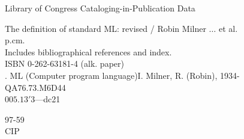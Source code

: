 \documentclass[12pt,twoside]{article}
\begin{document}
\noindent
Library of Congress Cataloging-in-Publication Data
\medskip
\begin{flushleft}
The definition of standard ML: revised / Robin Milner $\ldots$ et al.\\
\quad\quad p.\quad cm.\\
\quad Includes bibliographical references and index.\\
\quad ISBN 0-262-63181-4 (alk. paper)\\
. ML (Computer program language)\quad I. Milner, R. (Robin), 1934-\\
QA76.73.M6D44\\
$005.13'3$---dc21
\end{flushleft}
\begin{flushright}
97-59\\
CIP
\end{flushright}
\clearpage
\pagestyle{headings}
\thispagestyle{empty}
\setcounter{page}{5}
\renewcommand{\thepage}{\roman{page}}
\tableofcontents
\clearpage
\pagestyle{empty}
\ \clearpage
\pagestyle{myheadings}
\pagestyle{empty}

\clearpage
\pagestyle{empty}
\ \clearpage
\pagestyle{headings}
\setcounter{page}{1}
\renewcommand{\thepage}{\arabic{page}}
\thispagestyle{empty}

\thispagestyle{empty}

\thispagestyle{empty}

\thispagestyle{empty}

\thispagestyle{empty}

\thispagestyle{empty}

\thispagestyle{empty}

\thispagestyle{empty}

\appendix
\thispagestyle{empty}

\blankPage
\thispagestyle{empty}

\blankPage
\thispagestyle{empty}

\blankPage
\thispagestyle{empty}

\blankPage
\thispagestyle{empty}

\thispagestyle{empty}

\blankPage
\thispagestyle{empty}

\blankPage
{}
\thispagestyle{empty}

\clearpage
\blankPage
\thispagestyle{empty}

\end{document}
